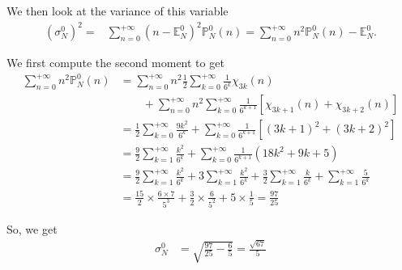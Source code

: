 \documentclass[a4paper,oneside,11pt]{book}
\renewcommand{\Pr}{\mathbb{P}}
\begin{document}
We then look at the variance of this variable
\begin{align}
	\left(\sigma_N^0\right)^2
	=&\sum_{n=0}^{+\infty}
	\left(n-\mathbb E_N^0\right)^2\Pr_N^0\left(n\right)
	=\sum_{n=0}^{+\infty}
	n^2\Pr_N^0\left(n\right)
	-\mathbb E_N^0.
\end{align}

We first compute the second moment to get
\begin{align}
	\sum_{n=0}^{+\infty}
	n^2\Pr_N^0\left(n\right)
	&=\sum_{n=0}^{+\infty}n^2
	\frac12\sum_{k=0}^{+\infty}\frac1{6^k}\chi_{3k}(n)
\\
	&\qquad+\sum_{n=0}^{+\infty}n^2
	\sum_{k=0}^{+\infty}\frac1{6^{k+1}}
	\left[
		\chi_{3k+1}(n)
		+\chi_{3k+2}(n)
	\right]
\\
	&=\frac12\sum_{k=0}^{+\infty}\frac{9k^2}{6^k}
	+\sum_{k=0}^{+\infty}\frac1{6^{k+1}}
	\left[
		\left(3k+1\right)^2
		+\left(3k+2\right)^2
	\right]
\\
	&=\frac92\sum_{k=1}^{+\infty}\frac{ k^2}{6^k}
	+\sum_{k=0}^{+\infty}\frac1{6^{k+1}}
	\left(
		18k^2
		+9k
		+5
	\right)
\\
	&=\frac92\sum_{k=1}^{+\infty}\frac{ k^2}{6^k}
	+3\sum_{k=1}^{+\infty}\frac{k^2}{6^k}
	+\frac32\sum_{k=1}^{+\infty}\frac k{6^k}
	+\sum_{k=1}^{+\infty}\frac5{6^k}
\\
	&=\frac{15}2\times\frac{6\times7}{5^3}
	+\frac32\times\frac{6}{5^2}
	+5\times\frac15
	=\frac{97}{25}
\end{align}

So, we get
\begin{align}
	\sigma_N^0
	&=\sqrt{\frac{97}{25}-\frac{6}{5}}
	=\frac{\sqrt{67}}5
 \end{align}
\end{document}
